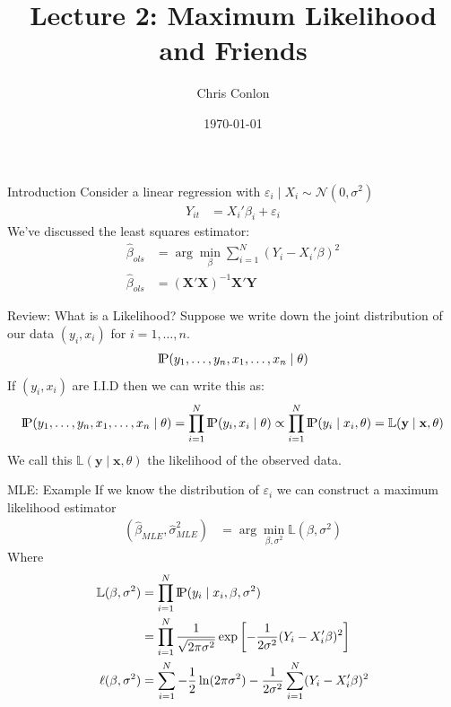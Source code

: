 




\title{Lecture 2: Maximum Likelihood and Friends}
\author{Chris Conlon }

\newcommand{\fp}{\frame[plain]}

\date{\today}


\maketitle

\begin{frame}{Introduction}
Consider a linear regression with $\varepsilon_i \mid X_i \sim \mathcal{N}(0,\sigma^2)$
\begin{align*}
Y_{it} &= X_{i}'\beta_i + \varepsilon_{i}
\end{align*}
We've discussed the \alert{least squares estimator}:
\begin{align*}
\widehat{\beta}_{ols} &= \arg \min_{\beta} \sum_{i=1}^N (Y_i - X_i' \beta)^2\\
\widehat{\beta}_{ols} &= (\mathbf{X}'\mathbf{X})^{-1} \mathbf{X}' \mathbf{Y}
\end{align*}
\end{frame}


\begin{frame}{Review: What is a Likelihood?}
Suppose we write down the joint distribution of our data $(y_i,x_i)$ for $i=1,\ldots,n$.
\begin{align*}
\text{I\kern-0.15em P}(y_1,\ldots,y_n, x_1,\ldots,x_n \mid  \theta)
\end{align*}
If  $(y_i,x_i)$ are I.I.D then we can write this as:
\begin{align*}
 \text{I\kern-0.15em P}(y_1,\ldots,y_n, x_1,\ldots,x_n \mid \theta) = \prod_{i=1}^N \text{I\kern-0.15em P}(y_i, x_i \mid \theta) \propto \prod_{i=1}^N \text{I\kern-0.15em P}(y_i \mid x_i , \theta)=\mathbb{L}( \mathbf{y} \mid \mathbf{x} ,\theta )
\end{align*}
We call this $\mathbb{L}( \mathbf{y}\mid \mathbf{x} ,\theta )$ the \alert{likelihood} of the observed data.
\end{frame}




\begin{frame}{MLE: Example}
If we know the distribution of $\varepsilon_i$ we can construct a \alert{maximum likelihood estimator}
\begin{align*}
(\widehat{\beta}_{MLE},\widehat{\sigma}^2_{MLE}) &= \arg \min_{\beta,\sigma^2} \mathbb{L}(\beta,\sigma^2)
\end{align*}
Where 
\begin{align*} 
\mathbb{L}(\beta,\sigma^2) &= \prod_{i=1}^N \text{I\kern-0.15em P}(y_i \mid x_i,\beta,\sigma^2) \\
                  &= \prod_{i=1}^N \frac{1}{\sqrt{2 \pi \sigma^2}} \exp \left[-\frac{1}{2\sigma^2}(Y_i - X_i' \beta)^2 \right]\\
\ell(\beta,\sigma^2) &= \sum_{i=1}^N -\frac{1}{2} \ln (2 \pi \sigma^2) - \frac{1}{2 \sigma^2} \sum_{i=1}^N(Y_i - X_i' \beta)^2
\end{align*}
\end{frame}

